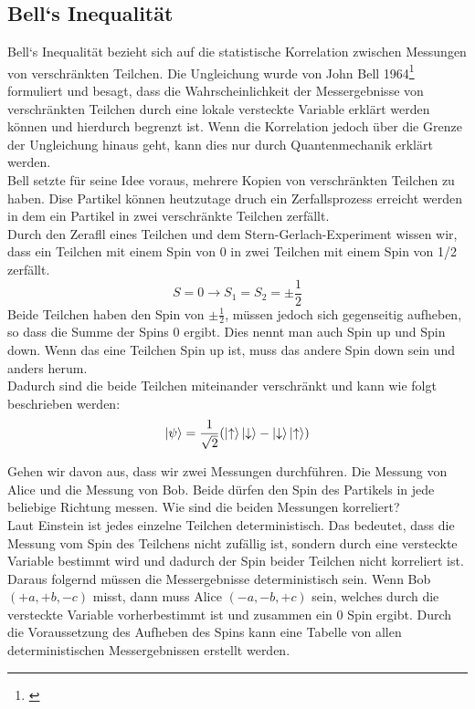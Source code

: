 \subsection{Bell`s Inequalität}
\label{subsec:bells_inequality}
Bell`s Inequalität bezieht sich auf die statistische Korrelation zwischen Messungen von verschränkten Teilchen.
Die Ungleichung wurde von John Bell 1964\footnote{\cite{bell_einstein_1964}} formuliert und besagt, dass die Wahrscheinlichkeit der Messergebnisse von verschränkten Teilchen durch eine lokale versteckte Variable erklärt werden können und hierdurch begrenzt ist.
Wenn die Korrelation jedoch über die Grenze der Ungleichung hinaus geht, kann dies nur durch Quantenmechanik erklärt werden.\\

Bell setzte für seine Idee voraus, mehrere Kopien von verschränkten Teilchen zu haben. Dise Partikel können heutzutage druch ein Zerfallsprozess erreicht werden in dem ein Partikel in zwei verschränkte Teilchen zerfällt.\\

Durch den Zerafll eines Teilchen und dem Stern-Gerlach-Experiment wissen wir, dass ein Teilchen mit einem Spin von 0 in zwei Teilchen mit einem Spin von 1/2 zerfällt.
\begin{equation}
    S = 0 \rightarrow S_1 = S_2 = \pm\frac{1}{2}
\end{equation}
Beide Teilchen haben den Spin von $\pm\frac{1}{2}$, müssen jedoch sich gegenseitig aufheben, so dass die Summe der Spins 0 ergibt.
Dies nennt man auch Spin up und Spin down. Wenn das eine Teilchen Spin up ist, muss das andere Spin down sein und anders herum.\\
Dadurch sind die beide Teilchen miteinander verschränkt und kann wie folgt beschrieben werden:
\begin{equation}
    \ket{\psi} = \frac{1}{\sqrt{2}}(\ket{\uparrow}\ket{\downarrow} - \ket{\downarrow}\ket{\uparrow})
\end{equation}

Gehen wir davon aus, dass wir zwei Messungen durchführen. Die Messung von Alice und die Messung von Bob.
Beide dürfen den Spin des Partikels in jede beliebige Richtung messen. Wie sind die beiden Messungen korreliert?\\
Laut Einstein ist jedes einzelne Teilchen deterministisch. Das bedeutet, dass die Messung vom Spin des Teilchens nicht zufällig ist, sondern durch eine versteckte Variable bestimmt wird und dadurch der Spin beider Teilchen nicht korreliert ist.\\
Daraus folgernd müssen die Messergebnisse deterministisch sein. Wenn Bob $(+a, +b, -c)$ misst, dann muss Alice $(-a, -b, +c)$ sein, welches durch die versteckte Variable vorherbestimmt ist und zusammen ein 0 Spin ergibt.
Durch die Voraussetzung des Aufheben des Spins kann eine Tabelle von allen deterministischen Messergebnissen erstellt werden.

